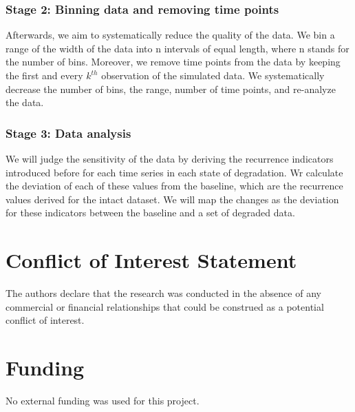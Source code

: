\documentclass[utf8]{FrontiersinVancouver}
\begin{document}
\subsubsection{Stage 2: Binning data and removing time points}

Afterwards, we aim to systematically reduce the quality of the data. We bin a range of the width of the data into n intervals of equal length, where n stands for the number of bins. Moreover, we remove time points from the data by keeping the first and every $k^{th}$ observation of the simulated data. We systematically decrease the number of bins, the range, number of time points, and re-analyze the data.

\subsubsection{Stage 3: Data analysis}
We will judge the sensitivity of the data by deriving the recurrence indicators introduced before for each time series in each state of degradation. Wr calculate the deviation of each of these values from the baseline, which are the recurrence values derived for the intact dataset. We will map the changes as the deviation for these indicators between the baseline and a set of degraded data.





\section*{Conflict of Interest Statement}
The authors declare that the research was conducted in the absence of any commercial or financial relationships that could be construed as a potential conflict of interest.

\section*{Funding}
No external funding was used for this project.
\end{document}

